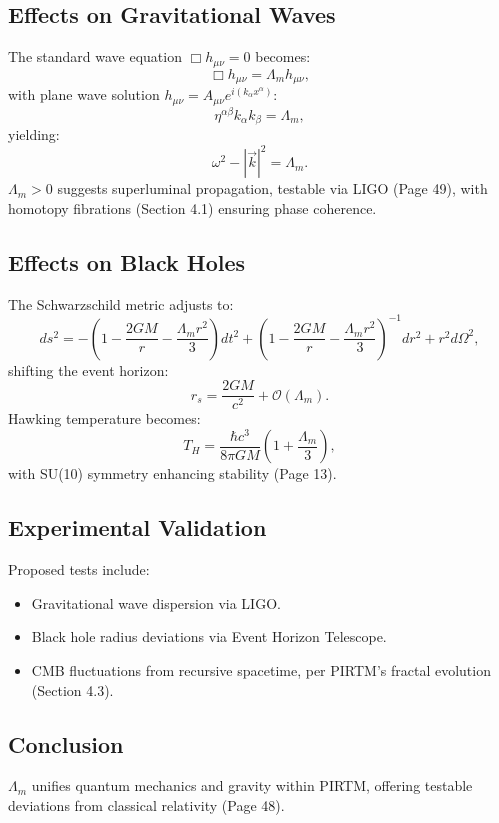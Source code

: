 \documentclass{article}
\theoremstyle{plain}
\begin{document}
\subsection{Effects on Gravitational Waves}
The standard wave equation \( \Box h_{\mu\nu} = 0 \) becomes:
\begin{equation}
\Box h_{\mu\nu} = \Lambda_m h_{\mu\nu},
\end{equation}
with plane wave solution \( h_{\mu\nu} = A_{\mu\nu} e^{i (k_\alpha x^\alpha)} \):
\begin{equation}
\eta^{\alpha\beta} k_\alpha k_\beta = \Lambda_m,
\end{equation}
yielding:
\begin{equation}
\omega^2 - |\vec{k}|^2 = \Lambda_m.
\end{equation}
\(\Lambda_m > 0\) suggests superluminal propagation, testable via LIGO (Page 49), with homotopy fibrations (Section 4.1) ensuring phase coherence.

\subsection{Effects on Black Holes}
The Schwarzschild metric adjusts to:
\begin{equation}
ds^2 = -\left(1 - \frac{2GM}{r} - \frac{\Lambda_m r^2}{3}\right) dt^2 + \left(1 - \frac{2GM}{r} - \frac{\Lambda_m r^2}{3}\right)^{-1} dr^2 + r^2 d\Omega^2,
\end{equation}
shifting the event horizon:
\begin{equation}
r_s = \frac{2GM}{c^2} + \mathcal{O}(\Lambda_m).
\end{equation}
Hawking temperature becomes:
\begin{equation}
T_H = \frac{\hbar c^3}{8\pi G M} \left(1 + \frac{\Lambda_m}{3}\right),
\end{equation}
with SU(10) symmetry enhancing stability (Page 13).

\subsection{Experimental Validation}
Proposed tests include:
\begin{itemize}
    \item Gravitational wave dispersion via LIGO.
    \item Black hole radius deviations via Event Horizon Telescope.
    \item CMB fluctuations from recursive spacetime, per PIRTM’s fractal evolution (Section 4.3).
\end{itemize}

\subsection{Conclusion}
\(\Lambda_m\) unifies quantum mechanics and gravity within PIRTM, offering testable deviations from classical relativity (Page 48).


\nocite{*}


\end{document}
